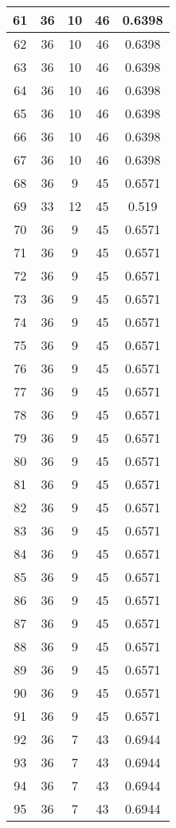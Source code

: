 \documentclass[letterpaper, 12pt]{article}
\begin{document}
\begin{longtable}{|c|c|c|c|c|}
\hline
61 & 36 & 10 & 46 & 0.6398 \\
\hline
62 & 36 & 10 & 46 & 0.6398 \\
\hline
63 & 36 & 10 & 46 & 0.6398 \\
\hline
64 & 36 & 10 & 46 & 0.6398 \\
\hline
65 & 36 & 10 & 46 & 0.6398 \\
\hline
66 & 36 & 10 & 46 & 0.6398 \\
\hline
67 & 36 & 10 & 46 & 0.6398 \\
\hline
68 & 36 & 9 & 45 & 0.6571 \\
\hline
69 & 33 & 12 & 45 & 0.519 \\
\hline
70 & 36 & 9 & 45 & 0.6571 \\
\hline
71 & 36 & 9 & 45 & 0.6571 \\
\hline
72 & 36 & 9 & 45 & 0.6571 \\
\hline
73 & 36 & 9 & 45 & 0.6571 \\
\hline
74 & 36 & 9 & 45 & 0.6571 \\
\hline
75 & 36 & 9 & 45 & 0.6571 \\
\hline
76 & 36 & 9 & 45 & 0.6571 \\
\hline
77 & 36 & 9 & 45 & 0.6571 \\
\hline
78 & 36 & 9 & 45 & 0.6571 \\
\hline
79 & 36 & 9 & 45 & 0.6571 \\
\hline
80 & 36 & 9 & 45 & 0.6571 \\
\hline
81 & 36 & 9 & 45 & 0.6571 \\
\hline
82 & 36 & 9 & 45 & 0.6571 \\
\hline
83 & 36 & 9 & 45 & 0.6571 \\
\hline
84 & 36 & 9 & 45 & 0.6571 \\
\hline
85 & 36 & 9 & 45 & 0.6571 \\
\hline
86 & 36 & 9 & 45 & 0.6571 \\
\hline
87 & 36 & 9 & 45 & 0.6571 \\
\hline
88 & 36 & 9 & 45 & 0.6571 \\
\hline
89 & 36 & 9 & 45 & 0.6571 \\
\hline
90 & 36 & 9 & 45 & 0.6571 \\
\hline
91 & 36 & 9 & 45 & 0.6571 \\
\hline
92 & 36 & 7 & 43 & 0.6944 \\
\hline
93 & 36 & 7 & 43 & 0.6944 \\
\hline
94 & 36 & 7 & 43 & 0.6944 \\
\hline
95 & 36 & 7 & 43 & 0.6944 \\

\end{longtable}
\end{document}
